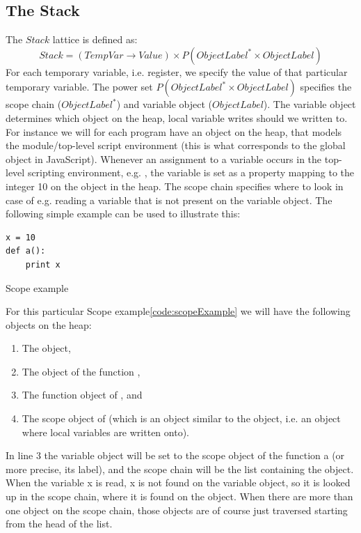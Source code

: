 \subsection{The Stack}
The $Stack$ lattice is defined as:
\begin{equation*}
Stack = (TempVar \rightarrow Value) \times P(ObjectLabel^{*} \times ObjectLabel)
\end{equation*}
For each temporary variable, i.e. register, we specify the value of that particular temporary variable. The power set $P(ObjectLabel^{*} \times ObjectLabel)$ specifies the scope chain ($ObjectLabel^{*}$) and variable object ($ObjectLabel$). The variable object determines which object on the heap, local variable writes should we written to. For instance we will for each program have an object on the heap, that models the module/top-level script environment \cite{pyref.main} (this is what corresponds to the global object in JavaScript). Whenever an assignment to a variable occurs in the top-level scripting environment, e.g. , the variable  is set as a property mapping to the integer 10 on the  object in the heap.
The scope chain specifies where to look in case of e.g. reading a variable that is not present on the variable object. The following simple example can be used to illustrate this:
\begin{listing}[H]
	\begin{verbatim}
x = 10 
def a():
	print x
	\end{verbatim}
\caption{Scope example}\label{code:ScopeExample}
\end{listing}
For this particular Scope example\ref{code:scopeExample} we will have the following objects on the heap:
\begin{enumerate}
  \item The  object,
  \item The object of the function ,
  \item The function object of , and
  \item The scope object of  (which is an object similar to the  object, i.e. an object where local variables are written onto).
\end{enumerate}
In line 3 the variable object will be set to the scope object of the function a (or more precise, its label), and the scope chain will be the list containing the  object. When the variable x is read, x is not found on the variable object, so it is looked up in the scope chain, where it is found on the  object. When there are more than one object on the scope chain, those objects are of course just traversed starting from the head of the list.
